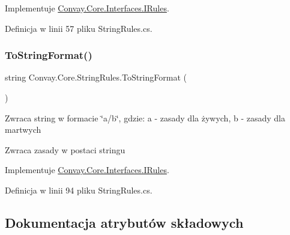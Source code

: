 Implementuje \hyperlink{interface_convay_1_1_core_1_1_interfaces_1_1_i_rules_ad184ed56601ab383d06db323a83fa48e}{Convay.\+Core.\+Interfaces.\+I\+Rules}.



Definicja w linii 57 pliku String\+Rules.\+cs.

\hypertarget{class_convay_1_1_core_1_1_string_rules_a4ecd053bf61402f58c6d40bf1e368a8a}{}\label{class_convay_1_1_core_1_1_string_rules_a4ecd053bf61402f58c6d40bf1e368a8a} 
\subsubsection{\texorpdfstring{To\+String\+Format()}{ToStringFormat()}}
{\footnotesize\ttfamily string Convay.\+Core.\+String\+Rules.\+To\+String\+Format (\begin{DoxyParamCaption}{ }\end{DoxyParamCaption})}



Zwraca string w formacie \char`\"{}a/b\char`\"{}, gdzie\+: a -\/ zasady dla żywych, b -\/ zasady dla martwych 

\begin{DoxyReturn}{Zwraca}
zasady w postaci stringu
\end{DoxyReturn}


Implementuje \hyperlink{interface_convay_1_1_core_1_1_interfaces_1_1_i_rules_a7863e051cf9285ab1ef5b888c74d5018}{Convay.\+Core.\+Interfaces.\+I\+Rules}.



Definicja w linii 94 pliku String\+Rules.\+cs.



\subsection{Dokumentacja atrybutów składowych}
\hypertarget{class_convay_1_1_core_1_1_string_rules_a0003339d29aea6bd1d4bfbcc6facc9d5}{}\label{class_convay_1_1_core_1_1_string_rules_a0003339d29aea6bd1d4bfbcc6facc9d5} 
